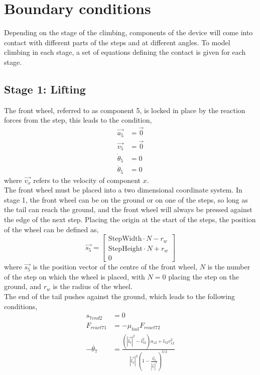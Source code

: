 \section{Boundary conditions}
Depending on the stage of the climbing, components of the device will come into contact with different parts of the steps and at different angles. To model climbing in each stage, a set of equations defining the contact is given for each stage.\\
\subsection*{Stage 1: Lifting}
The front wheel, referred to as component 5, is locked in place by the reaction forces from the step, this leads to the condition,
\begin{subequations}
	\label{wheel1locked}
	\begin{align}
		\vec{a_5} &= \vec{0}\\
		\vec{v_5} &= \vec{0}\\
		\dot{\theta}_5 &= 0\\
		\ddot{\theta}_5 &= 0
	\end{align}
\end{subequations}
where $\vec{v_x}$ refers to the velocity of component $x$. \\
The front wheel must be placed into a two dimensional coordinate system. In stage 1, the front wheel can be on the ground or on one of the steps, so long as the tail can reach the ground, and the front wheel will always be pressed against the edge of the next step. Placing the origin at the start of the steps, the position of the wheel can be defined as,
\begin{equation}
	\vec{s_5}
	=
	\begin{bmatrix}
		\mathrm{StepWidth}\cdot N-r_w\\
		\mathrm{StepHeight}\cdot N+r_w\\
		0
	\end{bmatrix}
\end{equation}
where $\vec{s_5}$ is the position vector of the centre of the front wheel, $N$ is the number of the step on which the wheel is placed, with $N = 0$ placing the step on the ground, and $r_w$ is the radius of the wheel.\\
The end of the tail pushes against the ground, which leads to the following conditions,
\begin{subequations}
	\label{tailonground}
	\begin{align}
		s_{7end2} &= 0\\
		F_{react71} &=  -\mu_{tail}F_{react72}\\
		-\ddot{\theta_7} &= \frac{(|\vec{l_7}|^2 - l_{72}^2)a_{12} + l_{72}v_{12}^2}{|\vec{l_7}|^3 (1 - \frac{l_{72}^2}{|\vec{l_7}|^2})^{3/2}} \label{tailongroundkinematics}
	\end{align}
\end{subequations}
